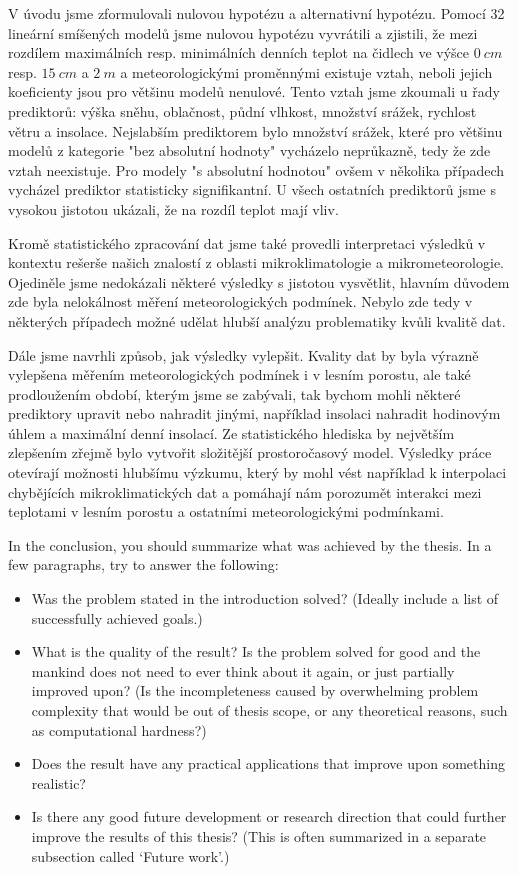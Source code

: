 V úvodu jsme zformulovali nulovou hypotézu a alternativní hypotézu. Pomocí 32 lineární smíšených modelů jsme nulovou hypotézu vyvrátili a zjistili, že mezi rozdílem maximálních resp. minimálních denních teplot na čidlech ve výšce $\SI{0}{cm}$ resp. $\SI{15}{cm}$ a $\SI{2}{m}$ a meteorologickými proměnnými existuje vztah, neboli jejich koeficienty jsou pro většinu modelů nenulové. Tento vztah jsme zkoumali u řady prediktorů: výška sněhu, oblačnost, půdní vlhkost, množství srážek, rychlost větru a insolace. Nejslabším prediktorem bylo množství srážek, které pro většinu modelů z kategorie "bez absolutní hodnoty" vycházelo neprůkazně, tedy že zde vztah neexistuje. Pro modely "s absolutní hodnotou" ovšem v několika případech vycházel prediktor statisticky signifikantní. U všech ostatních prediktorů jsme s vysokou jistotou ukázali, že na rozdíl teplot mají vliv.

Kromě statistického zpracování dat jsme také provedli interpretaci výsledků v kontextu rešerše našich znalostí z oblasti mikroklimatologie a mikrometeorologie. Ojediněle jsme nedokázali některé výsledky s jistotou vysvětlit, hlavním důvodem zde byla nelokálnost měření meteorologických podmínek. Nebylo zde tedy v některých případech možné udělat hlubší analýzu problematiky kvůli kvalitě dat.

Dále jsme navrhli způsob, jak výsledky vylepšit. Kvality dat by byla výrazně vylepšena měřením meteorologických podmínek i v lesním porostu, ale také prodloužením období, kterým jsme se zabývali, tak bychom mohli některé prediktory upravit nebo nahradit jinými, například insolaci nahradit hodinovým úhlem a maximální denní insolací. Ze statistického hlediska by největším zlepšením zřejmě bylo vytvořit složitější prostoročasový model. Výsledky práce otevírají možnosti hlubšímu výzkumu, který by mohl vést například k interpolaci chybějících mikroklimatických dat a pomáhají nám porozumět interakci mezi teplotami v lesním porostu a ostatními meteorologickými podmínkami.

In the conclusion, you should summarize what was achieved by the thesis. In a few paragraphs, try to answer the following:
\begin{itemize}
\item Was the problem stated in the introduction solved? (Ideally include a list of successfully achieved goals.)
\item What is the quality of the result? Is the problem solved for good and the mankind does not need to ever think about it again, or just partially improved upon? (Is the incompleteness caused by overwhelming problem complexity that would be out of thesis scope, or any theoretical reasons, such as computational hardness?)
\item Does the result have any practical applications that improve upon something realistic?
\item Is there any good future development or research direction that could further improve the results of this thesis? (This is often summarized in a separate subsection called `Future work'.)
\end{itemize}
